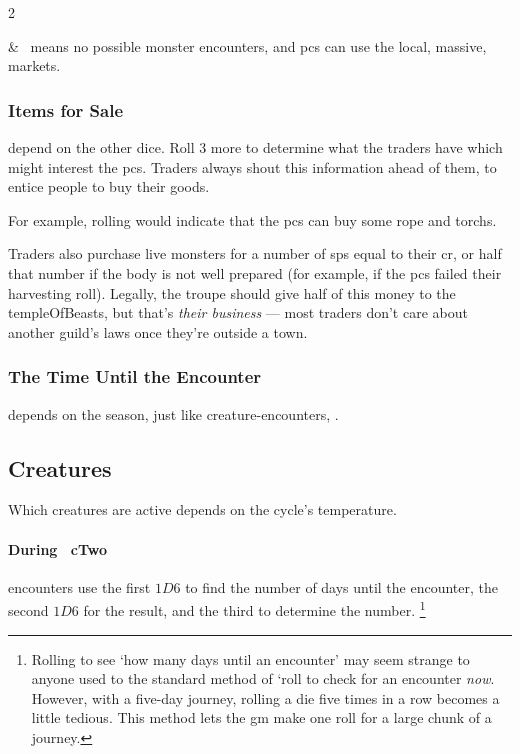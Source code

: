 \begin{multicols}{2}
\begin{boxtable}
   &
  \encCivilization\ means no possible monster encounters, and \glspl{pc} can use the local, massive, markets.
  \\
\end{boxtable}

\subsubsection{Items for Sale}
\label{traders}
depend on the other dice.  Roll 3 more to determine what the traders have which
might interest the \glspl{pc}.  Traders always shout this information ahead of
them, to entice people to buy their goods.

\encTraders

For example, rolling  would indicate that the \glspl{pc} can buy some rope and \glspl{torch}.

Traders also purchase live \glspl{monster} for a number of \glspl{sp} equal to
their \gls{cr}, or half that number if the body is not well prepared (for
example, if the \glspl{pc} failed their \gls{harvesting} roll).  Legally, the
troupe should give half of this money to the \gls{templeOfBeasts}, but that's
\emph{their business} --- most traders don't care about another guild's laws
once they're outside a town.

\subsubsection{The Time Until the Encounter}
depends on the season, just like creature-encounters, .

\needspace{8em}
\subsection{Creatures}
\label{creatureEncounters}

Which creatures are active depends on the \gls{cycle}'s temperature.

\toggletrue{genExamples}
\setcounter{enc}{19}
\begin{boxtable}[rXc]
\end{boxtable}

\bigbreak
\setcounter{temperature}{0}
\paragraph{During \showTemperature\ \gls{cTwo}}
encounters use the first $1D6$ to find the number of days until the encounter, the second $1D6$ for the result, and the third to determine the number.%
\footnote{Rolling to see `how many days until an encounter' may seem strange to anyone used to the standard method of `roll to check for an encounter \emph{now}.
However, with a five-day journey, rolling a die five times in a row becomes a little tedious.
This method lets the \gls{gm} make one roll for a large chunk of a journey.}


\end{multicols}
